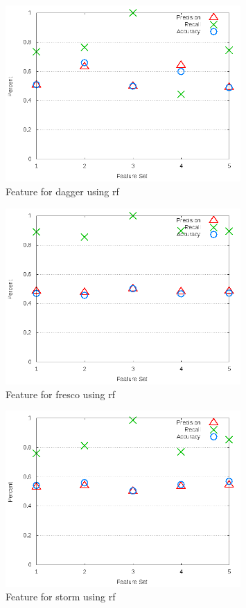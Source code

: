 \begin{figure}[!ht]
    \centering
        \includegraphics[width=0.8\textwidth]{images/rf/test_3/dagger_sample_range}
        \caption{Feature for dagger using \gls{rf}}
        \label{fig:test_3_dagger_rf}
\end{figure}

\begin{figure}[!ht]
    \centering
        \includegraphics[width=0.8\textwidth]{images/rf/test_3/fresco_sample_range}
        \caption{Feature for fresco using \gls{rf}}
        \label{fig:test_3_fresco_rf}
\end{figure}

\begin{figure}[!ht]
    \centering
        \includegraphics[width=0.8\textwidth]{images/rf/test_3/storm_sample_range}
        \caption{Feature for storm using \gls{rf}}
        \label{fig:test_3_storm_rf}
\end{figure}

